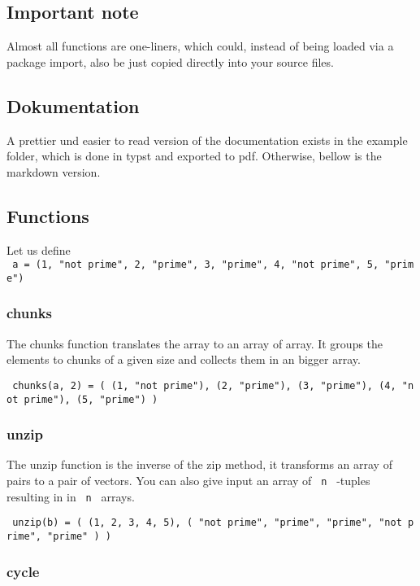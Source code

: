 \subsection{Important note}\label{important-note}

Almost all functions are one-liners, which could, instead of being
loaded via a package import, also be just copied directly into your
source files.

\subsection{Dokumentation}\label{dokumentation}

A prettier und easier to read version of the documentation exists in the
example folder, which is done in typst and exported to pdf. Otherwise,
bellow is the markdown version.

\subsection{Functions}\label{functions}

Let us define
\texttt{\ a\ =\ (1,\ "not\ prime",\ 2,\ "prime",\ 3,\ "prime",\ 4,\ "not\ prime",\ 5,\ "prime")\ }

\subsubsection{chunks}\label{chunks}

The chunks function translates the array to an array of array. It groups
the elements to chunks of a given size and collects them in an bigger
array.

\texttt{\ chunks(a,\ 2)\ =\ (\ (1,\ "not\ prime"),\ (2,\ "prime"),\ (3,\ "prime"),\ (4,\ "not\ prime"),\ (5,\ "prime")\ )\ }

\subsubsection{unzip}\label{unzip}

The unzip function is the inverse of the zip method, it transforms an
array of pairs to a pair of vectors. You can also give input an array of
\texttt{\ n\ } -tuples resulting in in \texttt{\ n\ } arrays.

\texttt{\ unzip(b)\ =\ (\ (1,\ 2,\ 3,\ 4,\ 5),\ (\ "not\ prime",\ "prime",\ "prime",\ "not\ prime",\ "prime"\ )\ )\ }

\subsubsection{cycle}\label{cycle}

